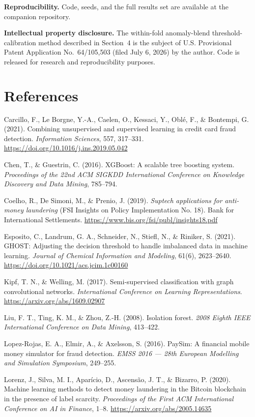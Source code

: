 \documentclass[11pt]{article}
\begin{document}
\textbf{Reproducibility.} Code, seeds, and the full results set are available at the companion repository.

\textbf{Intellectual property disclosure.} The within-fold anomaly-blend threshold-calibration method described in Section~4 is the subject of U.S. Provisional Patent Application No.~64/105,503 (filed July 6, 2026) by the author. Code is released for research and reproducibility purposes.

\section*{References}
\begingroup
\setlength{\parindent}{-1.4em}
\setlength{\leftskip}{1.4em}

Carcillo, F., Le Borgne, Y.-A., Caelen, O., Kessaci, Y., Obl\'{e}, F., \& Bontempi, G. (2021). Combining unsupervised and supervised learning in credit card fraud detection. \emph{Information Sciences}, 557, 317--331. \url{https://doi.org/10.1016/j.ins.2019.05.042}

Chen, T., \& Guestrin, C. (2016). XGBoost: A scalable tree boosting system. \emph{Proceedings of the 22nd ACM SIGKDD International Conference on Knowledge Discovery and Data Mining}, 785--794.

Coelho, R., De Simoni, M., \& Prenio, J. (2019). \emph{Suptech applications for anti-money laundering} (FSI Insights on Policy Implementation No. 18). Bank for International Settlements. \url{https://www.bis.org/fsi/publ/insights18.pdf}

Esposito, C., Landrum, G. A., Schneider, N., Stiefl, N., \& Riniker, S. (2021). GHOST: Adjusting the decision threshold to handle imbalanced data in machine learning. \emph{Journal of Chemical Information and Modeling}, 61(6), 2623--2640. \url{https://doi.org/10.1021/acs.jcim.1c00160}

Kipf, T. N., \& Welling, M. (2017). Semi-supervised classification with graph convolutional networks. \emph{International Conference on Learning Representations}. \url{https://arxiv.org/abs/1609.02907}

Liu, F. T., Ting, K. M., \& Zhou, Z.-H. (2008). Isolation forest. \emph{2008 Eighth IEEE International Conference on Data Mining}, 413--422.

Lopez-Rojas, E. A., Elmir, A., \& Axelsson, S. (2016). PaySim: A financial mobile money simulator for fraud detection. \emph{EMSS 2016 --- 28th European Modelling and Simulation Symposium}, 249--255.

Lorenz, J., Silva, M. I., Apar\'{i}cio, D., Ascens\~{a}o, J. T., \& Bizarro, P. (2020). Machine learning methods to detect money laundering in the Bitcoin blockchain in the presence of label scarcity. \emph{Proceedings of the First ACM International Conference on AI in Finance}, 1--8. \url{https://arxiv.org/abs/2005.14635}
\end{document}
